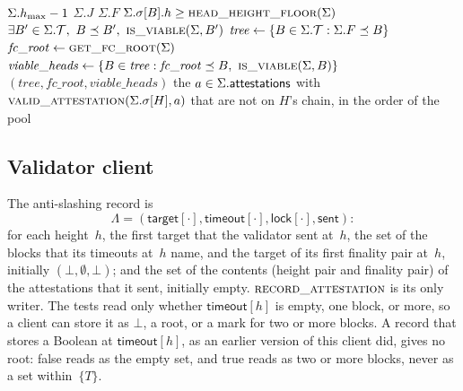 {\begin{algorithmic}[1]
  \State \Return $\Sigma.h_{\max}-1$
\EndFunction
\vspace{1pt}
    \State \Return $\Sigma.J$
  \EndIf
  \State \Return $\Sigma.F$
\EndFunction
\vspace{1pt}
  \State \Return $\Sigma.\sigma[B].h\geq\Call{head\_height\_floor}{\Sigma}$
\EndFunction
\vspace{1pt}
  \State \Return $\exists B'\in\Sigma.\T,\ B\preceq B',\
    \Call{is\_viable}{\Sigma,B'}$
\EndFunction
\vspace{1pt}
  \State $\mathit{tree}\gets\{B\in\Sigma.\mathcal T:\Sigma.F\preceq B\}$
  \State $\mathit{fc\_root}\gets\Call{get\_fc\_root}{\Sigma}$
  \State $\mathit{viable\_heads}\gets\{B\in\mathit{tree}:
    \mathit{fc\_root}\preceq B,\ \Call{is\_viable}{\Sigma,B}\}$
  \State \Return $(\mathit{tree},\mathit{fc\_root},\mathit{viable\_heads})$
\EndFunction
\vspace{1pt}
  \State \Return the $a\in\Sigma.\mathsf{attestations}$ with
    $\Call{valid\_attestation}{\Sigma.\sigma[H],a}$ that are not on $H$'s chain,
  \Statex \hspace{2em}in the order of the pool
\EndFunction
\end{algorithmic}
}

\subsection{Validator client}\label{sec:fg-client}

The anti-slashing record is
\[
 \Lambda=(\mathsf{target}[\cdot],\mathsf{timeout}[\cdot],
 \mathsf{lock}[\cdot],\mathsf{sent}):
\]
for each height~$h$, the first target that the validator sent at~$h$,
the set of the blocks that its timeouts at~$h$ name, and the target of
its first finality pair at~$h$, initially $(\bot,\emptyset,\bot)$; and
the set of the contents (height pair and finality pair) of the
attestations that it sent, initially empty.
$\Call{record\_attestation}{}$ is its only writer.  The tests read only
whether $\mathsf{timeout}[h]$ is empty, one block, or more, so a client
can store it as $\bot$, a root, or a mark for two or more blocks.  A
record that stores a Boolean at $\mathsf{timeout}[h]$, as an earlier
version of this client did, gives no root: false reads as the empty set,
and true reads as two or more blocks, never as a set within~$\{T\}$.

